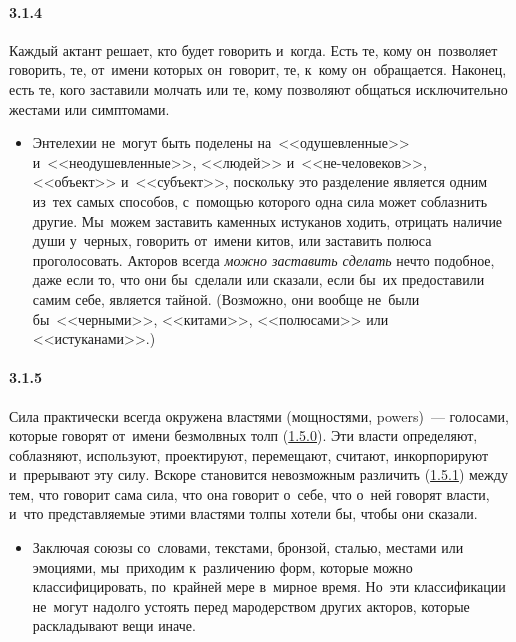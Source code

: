 \paragraph{3.1.4}\hypertarget{par:3.1.4}{} Каждый актант решает, кто будет говорить и~когда. Есть те, кому он~позволяет говорить, те, от~имени которых он~говорит, те, к~кому он~обращается. Наконец, есть те, кого заставили молчать или те, кому позволяют общаться исключительно жестами или
симптомами. 
	\begin{itemize}
	\item 
	Энтелехии не~могут быть поделены на~<<одушевленные>> и~<<неодушевленные>>, <<людей>> и~<<не-человеков>>, <<объект>> и~<<субъект>>, поскольку это разделение является одним из~тех самых способов, с~помощью которого одна сила может соблазнить другие. Мы~можем заставить каменных истуканов ходить, отрицать наличие души у~черных, говорить от~имени китов, или заставить полюса проголосовать. Акторов всегда {\itshape можно заставить сделать} нечто подобное, даже если то, что они бы~сделали или сказали, если бы~их предоставили самим себе, является тайной. (Возможно, они вообще не~были бы~<<черными>>, <<китами>>, <<полюсами>> или <<истуканами>>.)
	\end{itemize}

\paragraph{3.1.5}\hypertarget{par:3.1.5}{} Сила практически всегда окружена властями (мощностями, powers)~--- голосами, которые говорят от~имени безмолвных толп (\hyperlink{par:1.5.0}{1.5.0}). Эти власти определяют, соблазняют,
используют, проектируют, перемещают, считают, инкорпорируют и~прерывают эту силу. Вскоре становится невозможным различить (\hyperlink{par:1.5.1}{1.5.1}) между тем, что говорит сама сила, что она говорит о~себе, что о~ней говорят власти, и~что представляемые этими властями толпы хотели бы, чтобы они сказали. 
	\begin{itemize}
	\item 
	Заключая союзы со~словами, текстами, бронзой, сталью, местами или эмоциями, мы~приходим к~различению форм, которые можно классифицировать, по~крайней мере в~мирное время. Но~эти классификации не~могут надолго устоять перед мародерством других акторов, которые раскладывают вещи иначе.
	\end{itemize}

